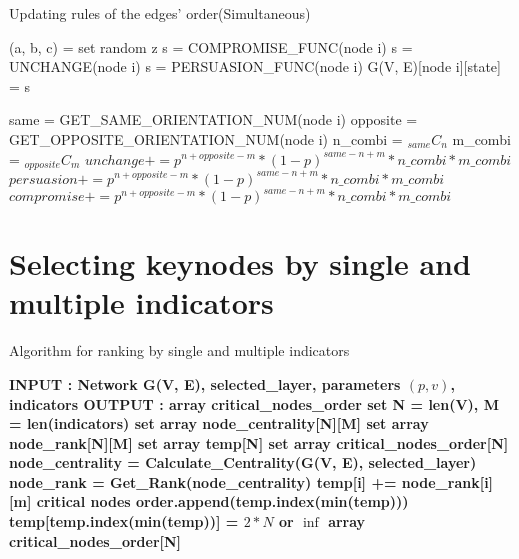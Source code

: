 \begin{breakablealgorithm}
	\caption{Updating rules of the edges' order(Simultaneous)}
	\label{edges_order}
	\begin{algorithmic} 
			\State (a, b, c) = 
			\State set random z
				\State s = COMPROMISE\_FUNC(node i)
			\EndIf
				\State s = UNCHANGE(node i)
			\EndIf
			 	\State s = PERSUASION\_FUNC(node i)
			\EndIf
			\State G(V, E)[node i][state] = s
		\EndFor
		\State {}
		
			\State same = GET\_SAME\_ORIENTATION\_NUM(node i)
			\State opposite = GET\_OPPOSITE\_ORIENTATION\_NUM(node i)
					\State n\_combi = $_{same} C_n$
					\State m\_combi = $_{opposite} C_m$
						\State $unchange += {p^{n+opposite-m}} * {(1 - p)^{same-n+m}} * n\_combi * m\_combi$
					\EndIf
						\State $persuasion += {p^{n+opposite-m}} * {(1 - p)^{same-n+m}} * n\_combi * m\_combi$
					\EndIf
						\State $compromise += {p^{n+opposite-m}} * {(1 - p)^{same-n+m}} * n\_combi * m\_combi$
					\EndIf
				\EndFor
			\EndFor
			\State {}
		\EndFunction			
	\end{algorithmic}
\end{breakablealgorithm}



\chapter{Selecting keynodes by single and multiple indicators}
\label{appendixD}
\begin{algorithm}[!htb]
	\caption{Algorithm for ranking by single and multiple indicators}
	\label{algo:keynodes}
	\begin{algorithmic} %
		\State  \bf{INPUT : Network G(V, E), selected\_layer, parameters $(p, v)$, indicators} \normalfont 
		\State  \bf{OUTPUT : array critical\_nodes\_order} \normalfont 
        \State set N = len(V), M = len(indicators)
		\State set array node\_centrality[N][M]
		\State set array node\_rank[N][M]
		\State set array temp[N]
		\State set array critical\_nodes\_order[N]
		\State node\_centrality = Calculate\_Centrality(G(V, E), selected\_layer)
		\State node\_rank = Get\_Rank(node\_centrality)
				\State temp[i] += node\_rank[i][m]
		 	\EndFor
		\EndFor
			\State critical nodes order.append(temp.index(min(temp)))
			\State temp[temp.index(min(temp))] = $2*N$ or $\inf$
		\EndFor
		\State \Return array critical\_nodes\_order[N]
	\end{algorithmic}
\end{algorithm}
